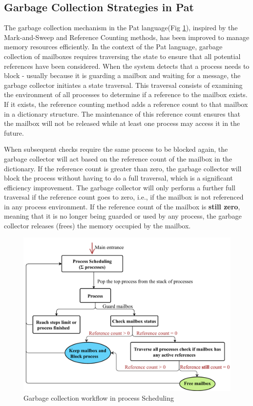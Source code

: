 \documentclass{l4proj}
\begin{document}
\subsection{Garbage Collection Strategies in Pat}
The garbage collection mechanism in the Pat language(Fig \ref{fig:gc1}), inspired by the Mark-and-Sweep and Reference Counting methods, has been improved to manage memory resources efficiently. In the context of the Pat language, garbage collection of mailboxes requires traversing the state to ensure that all potential references have been considered. When the system detects that a process needs to block - usually because it is guarding a mailbox and waiting for a message, the garbage collector initiates a state traversal. This traversal consists of examining the environment of all processes to determine if a reference to the mailbox exists. If it exists, the reference counting method adds a reference count to that mailbox in a dictionary structure. The maintenance of this reference count ensures that the mailbox will not be released while at least one process may access it in the future.

When subsequent checks require the same process to be blocked again, the garbage collector will act based on the reference count of the mailbox in the dictionary. If the reference count is greater than zero, the garbage collector will block the process without having to do a full traversal, which is a significant efficiency improvement. The garbage collector will only perform a further full traversal if the reference count goes to zero, i.e., if the mailbox is not referenced in any process environment. If the reference count of the mailbox is \textbf{still zero}, meaning that it is no longer being guarded or used by any process, the garbage collector releases (frees) the memory occupied by the mailbox.


\begin{figure}[h]
    \centering
    \includegraphics[width=1\linewidth]{dissertation/images/gc.pdf}    
    \caption{ 
    Garbage collection workflow in process Scheduling
    }
    \label{fig:gc1} 
\end{figure}
\vspace{1\baselineskip} 
\end{document}
